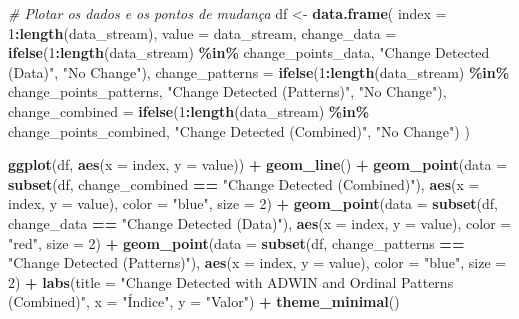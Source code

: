 \documentclass[
]{article}
\newenvironment{Shaded}{\begin{snugshade}}{\end{snugshade}}
\newcommand{\AttributeTok}[1]{\textcolor[rgb]{0.13,0.29,0.53}{#1}}
\newcommand{\CommentTok}[1]{\textcolor[rgb]{0.56,0.35,0.01}{\textit{#1}}}
\newcommand{\DecValTok}[1]{\textcolor[rgb]{0.00,0.00,0.81}{#1}}
\newcommand{\FunctionTok}[1]{\textcolor[rgb]{0.13,0.29,0.53}{\textbf{#1}}}
\newcommand{\NormalTok}[1]{#1}
\newcommand{\OtherTok}[1]{\textcolor[rgb]{0.56,0.35,0.01}{#1}}
\newcommand{\SpecialCharTok}[1]{\textcolor[rgb]{0.81,0.36,0.00}{\textbf{#1}}}
\newcommand{\StringTok}[1]{\textcolor[rgb]{0.31,0.60,0.02}{#1}}
\begin{document}
\begin{Shaded}
\begin{Highlighting}[]
\CommentTok{\# Plotar os dados e os pontos de mudança}
\NormalTok{df }\OtherTok{\textless{}{-}} \FunctionTok{data.frame}\NormalTok{(}
  \AttributeTok{index =} \DecValTok{1}\SpecialCharTok{:}\FunctionTok{length}\NormalTok{(data\_stream),}
  \AttributeTok{value =}\NormalTok{ data\_stream,}
  \AttributeTok{change\_data =} \FunctionTok{ifelse}\NormalTok{(}\DecValTok{1}\SpecialCharTok{:}\FunctionTok{length}\NormalTok{(data\_stream) }\SpecialCharTok{\%in\%}\NormalTok{ change\_points\_data, }\StringTok{"Change Detected (Data)"}\NormalTok{, }\StringTok{"No Change"}\NormalTok{),}
  \AttributeTok{change\_patterns =} \FunctionTok{ifelse}\NormalTok{(}\DecValTok{1}\SpecialCharTok{:}\FunctionTok{length}\NormalTok{(data\_stream) }\SpecialCharTok{\%in\%}\NormalTok{ change\_points\_patterns, }\StringTok{"Change Detected (Patterns)"}\NormalTok{, }\StringTok{"No Change"}\NormalTok{),}
  \AttributeTok{change\_combined =} \FunctionTok{ifelse}\NormalTok{(}\DecValTok{1}\SpecialCharTok{:}\FunctionTok{length}\NormalTok{(data\_stream) }\SpecialCharTok{\%in\%}\NormalTok{ change\_points\_combined, }\StringTok{"Change Detected (Combined)"}\NormalTok{, }\StringTok{"No Change"}\NormalTok{)}
\NormalTok{)}

\FunctionTok{ggplot}\NormalTok{(df, }\FunctionTok{aes}\NormalTok{(}\AttributeTok{x =}\NormalTok{ index, }\AttributeTok{y =}\NormalTok{ value)) }\SpecialCharTok{+}
  \FunctionTok{geom\_line}\NormalTok{() }\SpecialCharTok{+}
  \FunctionTok{geom\_point}\NormalTok{(}\AttributeTok{data =} \FunctionTok{subset}\NormalTok{(df, change\_combined }\SpecialCharTok{==} \StringTok{"Change Detected (Combined)"}\NormalTok{), }\FunctionTok{aes}\NormalTok{(}\AttributeTok{x =}\NormalTok{ index, }\AttributeTok{y =}\NormalTok{ value), }\AttributeTok{color =} \StringTok{"blue"}\NormalTok{, }\AttributeTok{size =} \DecValTok{2}\NormalTok{) }\SpecialCharTok{+}
  \FunctionTok{geom\_point}\NormalTok{(}\AttributeTok{data =} \FunctionTok{subset}\NormalTok{(df, change\_data }\SpecialCharTok{==} \StringTok{"Change Detected (Data)"}\NormalTok{), }\FunctionTok{aes}\NormalTok{(}\AttributeTok{x =}\NormalTok{ index, }\AttributeTok{y =}\NormalTok{ value), }\AttributeTok{color =} \StringTok{"red"}\NormalTok{, }\AttributeTok{size =} \DecValTok{2}\NormalTok{) }\SpecialCharTok{+}
  \FunctionTok{geom\_point}\NormalTok{(}\AttributeTok{data =} \FunctionTok{subset}\NormalTok{(df, change\_patterns }\SpecialCharTok{==} \StringTok{"Change Detected (Patterns)"}\NormalTok{), }\FunctionTok{aes}\NormalTok{(}\AttributeTok{x =}\NormalTok{ index, }\AttributeTok{y =}\NormalTok{ value), }\AttributeTok{color =} \StringTok{"blue"}\NormalTok{, }\AttributeTok{size =} \DecValTok{2}\NormalTok{) }\SpecialCharTok{+}
  \FunctionTok{labs}\NormalTok{(}\AttributeTok{title =} \StringTok{"Change Detected with ADWIN and Ordinal Patterns (Combined)"}\NormalTok{, }\AttributeTok{x =} \StringTok{"Índice"}\NormalTok{, }\AttributeTok{y =} \StringTok{"Valor"}\NormalTok{) }\SpecialCharTok{+}
  \FunctionTok{theme\_minimal}\NormalTok{()}
\end{Highlighting}
\end{Shaded}
\end{document}

